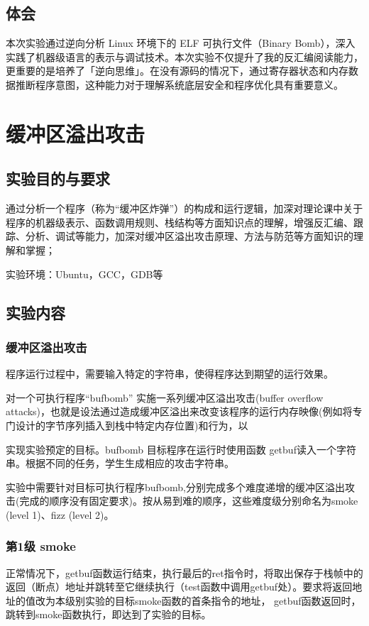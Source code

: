 \documentclass[supercite]{Experimental_Report}
\theoremstyle{definition}
\begin{document}
	\subsection{体会}
	本次实验通过逆向分析 Linux 环境下的 ELF 可执行文件（Binary Bomb），深入实践了机器级语言的表示与调试技术。本次实验不仅提升了我的反汇编阅读能力，更重要的是培养了「逆向思维」。在没有源码的情况下，通过寄存器状态和内存数据推断程序意图，这种能力对于理解系统底层安全和程序优化具有重要意义。
	
	\section{缓冲区溢出攻击}
	\subsection{实验目的与要求}
	通过分析一个程序（称为“缓冲区炸弹”）的构成和运行逻辑，加深对理论课中关于程序的机器级表示、函数调用规则、栈结构等方面知识点的理解，增强反汇编、跟踪、分析、调试等能力，加深对缓冲区溢出攻击原理、方法与防范等方面知识的理解和掌握；
	
	实验环境：Ubuntu，GCC，GDB等
	
	
	\subsection{实验内容}
	\subsubsection{缓冲区溢出攻击}
	程序运行过程中，需要输入特定的字符串，使得程序达到期望的运行效果。
	
	对一个可执行程序“bufbomb” 实施一系列缓冲区溢出攻击(buffer overflow attacks)，也就是设法通过造成缓冲区溢出来改变该程序的运行内存映像(例如将专门设计的字节序列插入到栈中特定内存位置)和行为，以
	
	实现实验预定的目标。bufbomb 目标程序在运行时使用函数 getbuf读入一个字符串。根据不同的任务，学生生成相应的攻击字符串。
	
	实验中需要针对目标可执行程序bufbomb,分别完成多个难度递增的缓冲区溢出攻击(完成的顺序没有固定要求)。按从易到难的顺序，这些难度级分别命名为smoke (level 1)、fizz (level 2)。 
	
	\subsubsection{第1级 smoke}
	正常情况下，getbuf函数运行结束，执行最后的ret指令时，将取出保存于栈帧中的返回（断点）地址并跳转至它继续执行（test函数中调用getbuf处）。要求将返回地址的值改为本级别实验的目标smoke函数的首条指令的地址， getbuf函数返回时，跳转到smoke函数执行，即达到了实验的目标。
\end{document}
